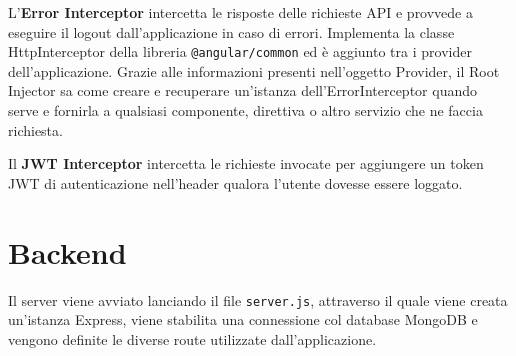\vspace{5mm}

L'\textbf{Error Interceptor} intercetta le risposte delle richieste API e provvede a eseguire il logout dall'applicazione in caso di errori. Implementa la classe HttpInterceptor della libreria \texttt{@angular/common} ed è aggiunto tra i provider dell'applicazione. Grazie alle informazioni presenti nell'oggetto Provider, il Root Injector sa come creare e recuperare un'istanza dell'ErrorInterceptor quando serve e fornirla a qualsiasi componente, direttiva o altro servizio che ne faccia richiesta.

\vspace{5mm}

Il \textbf{JWT Interceptor} intercetta le richieste invocate per aggiungere un token JWT di autenticazione nell'header qualora l'utente dovesse essere loggato.

\section{Backend}
Il server viene avviato lanciando il file \texttt{server.js}, attraverso il quale viene creata un'istanza Express, viene stabilita una connessione col database MongoDB e vengono definite le diverse route utilizzate dall'applicazione.

